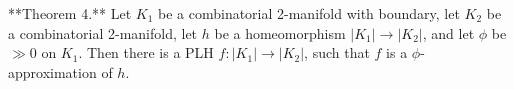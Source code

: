 **Theorem 4.** Let $K_1$ be a combinatorial 2-manifold with boundary, let $K_2$ be a combinatorial 2-manifold, let $h$ be a homeomorphism $|K_1| \to |K_2|$, and let $\phi$ be $\gg 0$ on $K_1$. Then there is a PLH $f: |K_1| \to |K_2|$, such that $f$ is a $\phi$-approximation of $h$.
